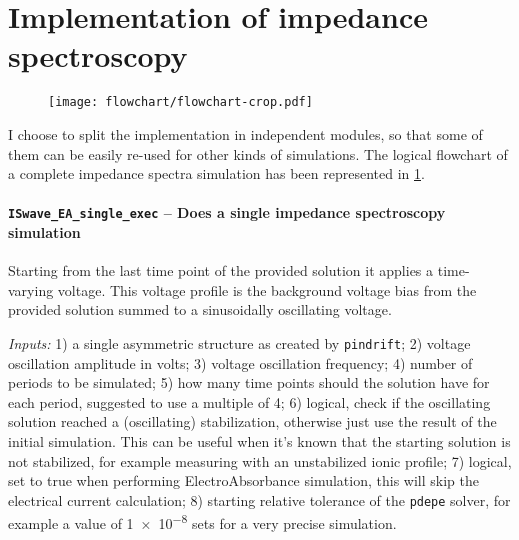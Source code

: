 \section{Implementation of impedance spectroscopy}

\begin{figure}
	\centering
	\texttt{[image: flowchart/flowchart-crop.pdf]}
	\label{fig:impedance_flowchart}
\end{figure}

I choose to split the implementation in independent modules, so that some of them can be easily re-used for other kinds of simulations.
The logical flowchart of a complete impedance spectra simulation has been represented in \cref{fig:impedance_flowchart}.


\paragraph{\texttt{ISwave\_EA\_single\_exec} -- Does a single impedance spectroscopy simulation}
Starting from the last time point of the provided solution it applies a time-varying voltage.
This voltage profile is the background voltage bias from the provided solution summed to a sinusoidally oscillating voltage.

\textit{Inputs:} 1) a single asymmetric structure as created by \texttt{pindrift};
2) voltage oscillation amplitude in volts;
3) voltage oscillation frequency;
4) number of periods to be simulated;
5) how many time points should the solution have for
     each period, suggested to use a multiple of 4;
6) logical, check if the oscillating solution reached a
     (oscillating) stabilization, otherwise just use the result of the
     initial simulation. This can be useful when it's known that the
     starting solution is not stabilized, for example measuring with an
     unstabilized ionic profile;
7) logical, set to true when performing ElectroAbsorbance simulation,
     this will skip the electrical current calculation;
8) starting relative tolerance of the \texttt{pdepe} solver, for example a
     value of \num{1e-8} sets for a very precise simulation.

